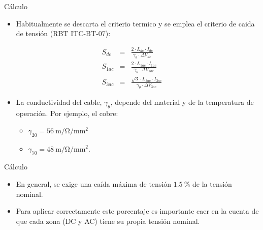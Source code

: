 \documentclass[xcolor={usenames,svgnames,dvipsnames}]{beamer}
\begin{document}
\begin{frame}[label={sec:orgea75e27}]{Cálculo}
\begin{itemize}
\item Habitualmente se descarta el criterio termico y se emplea el criterio de caida de tensión (RBT ITC-BT-07):
\end{itemize}

\[
  \begin{aligned}
    S_{dc} & = & \frac{2 \cdot L_{dc}\cdot I_{dc}}{\gamma_\theta \cdot \Delta V_{dc}}\\
    S_{1ac} & = & \frac{2\cdot L_{1ac}\cdot I_{1ac}}{\gamma_\theta \cdot \Delta V_{1ac}}\\
    S_{3ac} & = & \frac{\sqrt{3} \cdot L_{3ac}\cdot I_{3ac}}{\gamma_\theta \cdot \Delta V_{3ac}}
  \end{aligned}
\]

\begin{itemize}
\item La conductividad del cable, \(\gamma_\theta\), depende del material y de la
temperatura de operación. Por ejemplo, el cobre:
\begin{itemize}
\item \(\gamma_{20} =\SI{56}{\meter\per\ohm\per\milli\meter\squared}\)
\item \(\gamma_{70} = \SI{48}{\meter\per\ohm\per\milli\meter\squared}\).
\end{itemize}
\end{itemize}
\end{frame}

\begin{frame}[label={sec:org1fc835d}]{Cálculo}
\begin{itemize}
\item En general, se exige una caída máxima de tensión
\(\SI{1.5}{\percent}\) de la tensión nominal.

\item Para aplicar correctamente este porcentaje es importante caer en la
cuenta de que \alert{cada zona (DC y AC) tiene su propia tensión nominal}.
\end{itemize}
\end{frame}
\end{document}
